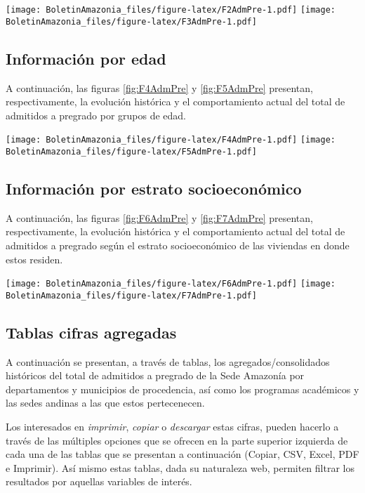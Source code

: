 \documentclass[
]{book}
\begin{document}
\texttt{[image: BoletinAmazonia\_files/figure-latex/F2AdmPre-1.pdf]}
\texttt{[image: BoletinAmazonia\_files/figure-latex/F3AdmPre-1.pdf]}

\hypertarget{informaciuxf3n-por-edad-1}{%
\subsection{Información por edad}\label{informaciuxf3n-por-edad-1}}

A continuación, las figuras \ref{fig:F4AdmPre} y \ref{fig:F5AdmPre} presentan, respectivamente, la evolución histórica y el comportamiento actual del total de admitidos a pregrado por grupos de edad.

\texttt{[image: BoletinAmazonia\_files/figure-latex/F4AdmPre-1.pdf]}
\texttt{[image: BoletinAmazonia\_files/figure-latex/F5AdmPre-1.pdf]}

\hypertarget{informaciuxf3n-por-estrato-socioeconuxf3mico-1}{%
\subsection{Información por estrato socioeconómico}\label{informaciuxf3n-por-estrato-socioeconuxf3mico-1}}

A continuación, las figuras \ref{fig:F6AdmPre} y \ref{fig:F7AdmPre} presentan, respectivamente, la evolución histórica y el comportamiento actual del total de admitidos a pregrado según el estrato socioeconómico de las viviendas en donde estos residen.

\texttt{[image: BoletinAmazonia\_files/figure-latex/F6AdmPre-1.pdf]}
\texttt{[image: BoletinAmazonia\_files/figure-latex/F7AdmPre-1.pdf]}

\hypertarget{tablas-cifras-agregadas-1}{%
\subsection{Tablas cifras agregadas}\label{tablas-cifras-agregadas-1}}

A continuación se presentan, a través de tablas, los agregados/consolidados históricos del total de admitidos a pregrado de la Sede Amazonía por departamentos y municipios de procedencia, así como los programas académicos y las sedes andinas a las que estos pertecenecen.

Los interesados en \emph{imprimir}, \emph{copiar} o \emph{descargar} estas cifras, pueden hacerlo a través de las múltiples opciones que se ofrecen en la parte superior izquierda de cada una de las tablas que se presentan a continuación (Copiar, CSV, Excel, PDF e Imprimir). Así mismo estas tablas, dada su naturaleza web, permiten filtrar los resultados por aquellas variables de interés.
\end{document}

